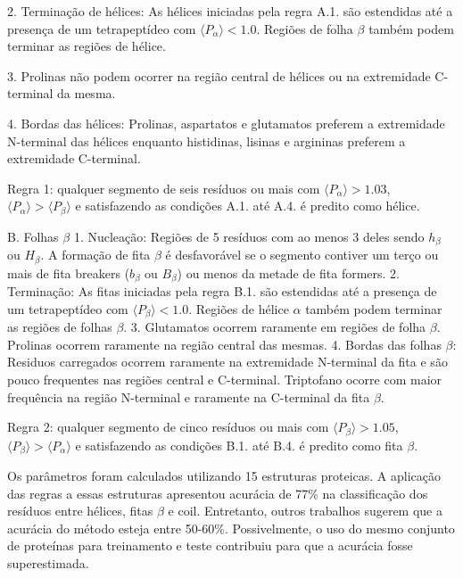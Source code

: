 2. Terminação de hélices: As hélices iniciadas pela regra A.1. são estendidas até a presença de um tetrapeptídeo com $\langle P_\alpha \rangle < 1.0$. Regiões de folha $\beta$ também podem terminar as regiões de hélice.

3. Prolinas não podem ocorrer na região central de hélices ou na extremidade C-terminal da mesma.

4. Bordas das hélices: Prolinas, aspartatos e glutamatos preferem a extremidade N-terminal das hélices enquanto histidinas, lisinas e argininas preferem a extremidade C-terminal.

Regra 1: qualquer segmento de seis resíduos ou mais com $\langle P_\alpha \rangle > 1.03$, $\langle P_\alpha \rangle > \langle P_\beta \rangle$ e satisfazendo as condições A.1. até A.4. é predito como hélice.

B. Folhas $\beta$
1. Nucleação: Regiões de 5 resíduos com ao menos 3 deles sendo $h_\beta$ ou $H_\beta$. A formação de fita $\beta$ é desfavorável se o segmento contiver um terço ou mais de fita breakers ($b_\beta$ ou $B_\beta$) ou menos da metade de fita formers.
2. Terminação: As fitas iniciadas pela regra B.1. são estendidas até a presença de um tetrapeptídeo com $\langle P_\beta \rangle < 1.0$. Regiões de hélice $\alpha$ também podem terminar as regiões de folhas $\beta$.
3. Glutamatos ocorrem raramente em regiões de folha $\beta$. Prolinas ocorrem raramente na região central das mesmas.
4. Bordas das folhas $\beta$: Residuos carregados ocorrem raramente na extremidade N-terminal da fita e são pouco frequentes nas regiões central e C-terminal. Triptofano ocorre com maior frequência na região N-terminal e raramente na C-terminal da fita $\beta.$

Regra 2: qualquer segmento de cinco resíduos ou mais com $\langle P_\beta \rangle > 1.05$, $\langle P_\beta \rangle > \langle P_\alpha \rangle$ e satisfazendo as condições B.1. até B.4. é predito como fita $\beta$.

Os parâmetros foram calculados utilizando 15 estruturas proteicas. A aplicação das regras a essas estruturas apresentou acurácia de 77\% na classificação dos resíduos entre hélices, fitas $\beta$ e coil. Entretanto, outros trabalhos sugerem que a acurácia do método esteja entre 50-60\%. Possivelmente, o uso do mesmo conjunto de proteínas para treinamento e teste contribuiu para que a acurácia fosse superestimada. 
